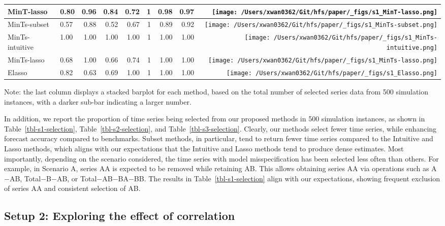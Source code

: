 \documentclass[
  11pt]{article}
\begin{document}
\begin{table}
\begin{threeparttable}
\begin{tabular}{llrrrrrr>{}r}
MinT-lasso & 0.80 & 0.96 & 0.84 & 0.72 & 1 & 0.98 & 0.97 & \texttt{[image: /Users/xwan0362/Git/hfs/paper/\_figs/s1\_MinT-lasso.png]}\\
\midrule
MinTs-subset & 0.57 & 0.88 & 0.52 & 0.67 & 1 & 0.89 & 0.92 & \texttt{[image: /Users/xwan0362/Git/hfs/paper/\_figs/s1\_MinTs-subset.png]}\\
MinTs-intuitive & 1.00 & 1.00 & 1.00 & 1.00 & 1 & 1.00 & 1.00 & \texttt{[image: /Users/xwan0362/Git/hfs/paper/\_figs/s1\_MinTs-intuitive.png]}\\
MinTs-lasso & 0.68 & 1.00 & 0.66 & 0.74 & 1 & 1.00 & 1.00 & \texttt{[image: /Users/xwan0362/Git/hfs/paper/\_figs/s1\_MinTs-lasso.png]}\\
\midrule
Elasso & 0.82 & 0.63 & 0.69 & 1.00 & 1 & 1.00 & 1.00 & \texttt{[image: /Users/xwan0362/Git/hfs/paper/\_figs/s1\_Elasso.png]}\\
\bottomrule
\end{tabular}
\begin{tablenotes}[para]
\item Note: the last column displays a stacked barplot for each method, based on the total number of selected series data from 500 simulation instances, with a darker sub-bar indicating a larger number.
\end{tablenotes}
\end{threeparttable}
\endgroup{}
\end{table}

In addition, we report the proportion of time series being selected from
our proposed methods in 500 simulation instances, as shown in
Table~\ref{tbl-s1-selection}, Table~\ref{tbl-s2-selection}, and
Table~\ref{tbl-s3-selection}. Clearly, our methods select fewer time
series, while enhancing forecast accuracy compared to benchmarks. Subset
methods, in particular, tend to return fewer time series compared to the
Intuitive and Lasso methods, which aligns with our expectations that the
Intuitive and Lasso methods tend to produce dense estimates. Most
importantly, depending on the scenario considered, the time series with
model misspecification has been selected less often than others. For
example, in Scenario A, series AA is expected to be removed while
retaining AB. This allows obtaining series AA via operations such as
A\(-\)AB, Total\(-\)B\(-\)AB, or Total\(-\)AB\(-\)BA\(-\)BB. The results
in Table~\ref{tbl-s1-selection} align with our expectations, showing
frequent exclusion of series AA and consistent selection of AB.

\hypertarget{sec-sim2}{%
\subsection{Setup 2: Exploring the effect of
correlation}\label{sec-sim2}}
\end{document}
